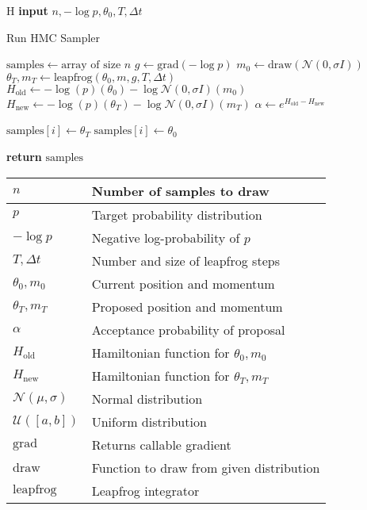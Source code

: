 \documentclass[conference]{IEEEtran}
\begin{document}
\begin{algorithm}{H}
\textbf{input} $n, -\log p, \theta_0, T, \Delta t$
\caption{Run HMC Sampler}
\begin{algorithmic}[H]
\State $\text{samples} \gets \text{array of size } n$
\State $g \gets \text{grad}(-\log p)$
    \State $m_0 \gets \text{draw}(\mathcal{N}(0, \sigma I))$
    \State $\theta_T, m_T \gets \text{leapfrog}(\theta_0, m, g, T, \Delta t)$
    \State $H_\text{old} \gets -\log(p)(\theta_0) - \log \mathcal{N}(0, \sigma I)(m_0)$
    \State $H_\text{new} \gets -\log(p)(\theta_T) - \log \mathcal{N}(0, \sigma I)(m_T)$
    \State $\alpha \gets e^{H_\text{old} - H_\text{new}}$
    
        \State $\text{samples}[i] \gets \theta_T$
    \Else
        \State $\text{samples}[i] \gets \theta_0$
    \EndIf
\EndFor
\end{algorithmic}
\textbf{return} $\text{samples}$
\end{algorithm}

\begin{tabular}{| m{1.5cm} | m{6cm} |}
    \hline
    $n$ & Number of samples to draw \\
    \hline
    $p$ & Target probability distribution \\
    \hline
    $-\log p$ & Negative log-probability of $p$ \\
    \hline
    $T, \Delta t$ & Number and size of leapfrog steps \\
    \hline
    $\theta_0, m_0$ & Current position and momentum \\
    \hline
    $\theta_T, m_T$ & Proposed position and momentum \\
    \hline
    $\alpha$ & Acceptance probability of proposal \\
    \hline
    $H_\text{old}$ & Hamiltonian function for $\theta_0, m_0$ \\
    \hline
    $H_\text{new}$ & Hamiltonian function for $\theta_T, m_T$ \\
    \hline
    $\mathcal{N}(\mu, \sigma)$ & Normal distribution \\
    \hline
    $\mathcal{U}([a, b])$ & Uniform distribution \\
    \hline
    $\text{grad}$ & Returns callable gradient \\
    \hline
    $\text{draw}$ & Function to draw from given distribution\\
    \hline
    $\text{leapfrog}$ & Leapfrog integrator \\
    \hline
\end{tabular} \\
\end{document}
